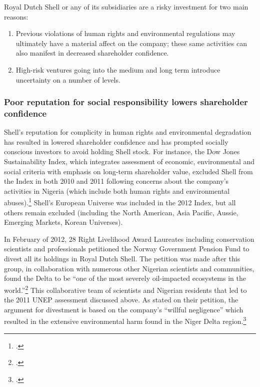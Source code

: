 Royal Dutch Shell or any of its subsidiaries are a risky investment for two main reasons:
\begin{enumerate}
	\item Previous violations of human rights and environmental regulations may ultimately have a material affect on the company; these same activities can also manifest in decreased shareholder confidence.
	\item High-risk ventures going into the medium and long term introduce uncertainty on a number of levels.
\end{enumerate}

	
	
	\subsubsection{Poor reputation for social responsibility lowers shareholder confidence}
	

	
Shell's reputation for complicity in human rights and environmental degradation has resulted in lowered shareholder confidence and has prompted socially conscious investors to avoid holding Shell stock.
For instance, the Dow Jones Sustainability Index, which integrates assessment of economic, environmental and social criteria with emphasis on long-term shareholder value, excluded Shell from the Index in both 2010 and 2011 following concerns about the company's activities in Nigeria (which include both human rights and environmental abuses).\footcite{ShellIndex}
Shell's European Universe was included in the 2012 Index, but all others remain excluded (including the North American, Asia Pacific, Aussie, Emerging Markets, Korean Universes).


In February of 2012, 28 Right Livelihood Award Laureates including conservation scientists and professionals petitioned the Norway Government Pension Fund to divest all its holdings in Royal Dutch Shell. 
The petition was made after this group, in collaboration with numerous other Nigerian scientists and communities, found the Delta to be ``one of the most severely oil-impacted ecosystems in the world.''\footcite[][]{NigerDeltaReport_2006}
This collaborative team of scientists and Nigerian residents that led to the 2011 UNEP assessment discussed above.
As stated on their petition, the argument for divestment is based on the company's ``willful negligence'' which resulted in the extensive environmental harm found in the Niger Delta region.\footcite[][]{NorwayPetition_2012}



